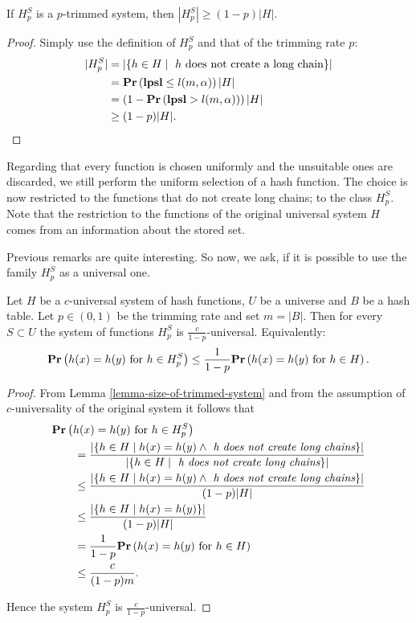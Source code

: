 \begin{lemma}
\label{lemma-size-of-trimmed-system}
If $H_p^S$ is a $p$-trimmed system, then $|H_p^S| \geq (1 - p)|H|$.
\end{lemma}
\begin{proof}
Simply use the definition of $H_p^S$ and that of the trimming rate $p$:
\[
\begin{split}
|H_p^S|
	& = |\lbrace h \in H \mid \text{ $h$ does not create a long chain} \rbrace| \\
	& =\mathbf{Pr}\left(\mathbf{lpsl} \leq l(m, \alpha)\right) |H| \\
	& = \left(1 - \mathbf{Pr}\left(\mathbf{lpsl} > l(m, \alpha)\right)\right) |H| \\
	& \geq (1 - p)|H| \text{.}
\end{split}
\]
\end{proof}

Regarding that every function is chosen uniformly and the unsuitable ones are discarded, we still perform the uniform selection of a hash function. The choice is now restricted to the functions that do not create long chains; to the class $H_p^S$. Note that the restriction to the functions of the original universal system $H$ comes from an information about the stored set.

Previous remarks are quite interesting. So now, we ask, if it is possible to use the family $H_p^S$ as a universal one.
\begin{theorem}
\label{theorem-p-trimmed-is-universal}
Let $H$ be a $c$-universal system of hash functions, $U$ be a universe and $B$ be a hash table. Let $p \in (0, 1)$ be the trimming rate and set $m = |B|$. Then for every $S \subset U$ the system of functions $H_p^S$ is $\frac{c}{1 - p}$-universal. Equivalently:
\[
	\mathbf{Pr}\left(h(x) = h(y) \text{ for } h \in H_p^S\right) \leq \frac{1}{1 - p} \mathbf{Pr}\left(h(x) = h(y) \text{ for } h \in H\right) \text{.}
\]
\end{theorem}
\begin{proof}
From Lemma \ref{lemma-size-of-trimmed-system} and from the assumption of $c$-universality of the original system it follows that 
\[
\begin{split}
& \mathbf{Pr}\left(h(x) = h(y) \text{ for } h \in H_p^S\right)  \\
	& \qquad =  \frac{|\{ h \in H \mid h(x) = h(y) \wedge \textit{ h does not create long chains} \}|}{|\lbrace h \in H \mid \textit{ h does not create long chains} \rbrace|} \\
	& \qquad \leq \frac{|\{ h \in H \mid h(x) = h(y) \wedge \textit{ h does not create long chains} \}|}{(1 - p)|H|} \\ 
	& \qquad \leq \frac{|\{ h \in H \mid h(x) = h(y) \}|}{(1 - p)|H|} \\
	& \qquad = \frac{1}{1 - p} \mathbf{Pr}\left(h(x) = h(y) \text{ for } h \in H\right) \\
	& \qquad \leq \frac{c}{(1 - p) m} \text{.}
\end{split}
\]

Hence the system $H_p^S$ is $\frac{c}{1 - p}$-universal.
\end{proof}

